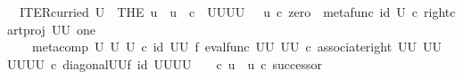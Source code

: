\begin{isabellebody}
\ \ {\isachardoublequoteopen}ITER{\isacharunderscore}{\kern0pt}curried\ U\ {\isacharequal}{\kern0pt}\ {\isacharparenleft}{\kern0pt}THE\ u\ {\isachardot}{\kern0pt}\ u\ {\isacharcolon}{\kern0pt}\ {\isasymnat}\isactrlsub c\ {\isasymrightarrow}\ {\isacharparenleft}{\kern0pt}U\isactrlbsup U\isactrlesup {\isacharparenright}{\kern0pt}\isactrlbsup U\isactrlbsup U\isactrlesup \isactrlesup \ {\isasymand}\ \ u\ {\isasymcirc}\isactrlsub c\ zero\ {\isacharequal}{\kern0pt}\ {\isacharparenleft}{\kern0pt}metafunc\ {\isacharparenleft}{\kern0pt}id\ U{\isacharparenright}{\kern0pt}\ {\isasymcirc}\isactrlsub c\ {\isacharparenleft}{\kern0pt}right{\isacharunderscore}{\kern0pt}cart{\isacharunderscore}{\kern0pt}proj\ {\isacharparenleft}{\kern0pt}U\isactrlbsup U\isactrlesup {\isacharparenright}{\kern0pt}\ one{\isacharparenright}{\kern0pt}{\isacharparenright}{\kern0pt}\isactrlsup {\isasymsharp}\ {\isasymand}\isanewline
\ \ \ \ {\isacharparenleft}{\kern0pt}{\isacharparenleft}{\kern0pt}meta{\isacharunderscore}{\kern0pt}comp\ U\ U\ U{\isacharparenright}{\kern0pt}\ {\isasymcirc}\isactrlsub c\ {\isacharparenleft}{\kern0pt}id\ {\isacharparenleft}{\kern0pt}U\isactrlbsup U\isactrlesup {\isacharparenright}{\kern0pt}\ {\isasymtimes}\isactrlsub f\ eval{\isacharunderscore}{\kern0pt}func\ {\isacharparenleft}{\kern0pt}U\isactrlbsup U\isactrlesup {\isacharparenright}{\kern0pt}\ {\isacharparenleft}{\kern0pt}U\isactrlbsup U\isactrlesup {\isacharparenright}{\kern0pt}{\isacharparenright}{\kern0pt}\ {\isasymcirc}\isactrlsub c\ {\isacharparenleft}{\kern0pt}associate{\isacharunderscore}{\kern0pt}right\ {\isacharparenleft}{\kern0pt}U\isactrlbsup U\isactrlesup {\isacharparenright}{\kern0pt}\ {\isacharparenleft}{\kern0pt}U\isactrlbsup U\isactrlesup {\isacharparenright}{\kern0pt}\ {\isacharparenleft}{\kern0pt}{\isacharparenleft}{\kern0pt}U\isactrlbsup U\isactrlesup {\isacharparenright}{\kern0pt}\isactrlbsup U\isactrlbsup U\isactrlesup \isactrlesup {\isacharparenright}{\kern0pt}{\isacharparenright}{\kern0pt}\ {\isasymcirc}\isactrlsub c\ {\isacharparenleft}{\kern0pt}diagonal{\isacharparenleft}{\kern0pt}U\isactrlbsup U\isactrlesup {\isacharparenright}{\kern0pt}{\isasymtimes}\isactrlsub f\ id\ {\isacharparenleft}{\kern0pt}{\isacharparenleft}{\kern0pt}U\isactrlbsup U\isactrlesup {\isacharparenright}{\kern0pt}\isactrlbsup U\isactrlbsup U\isactrlesup \isactrlesup {\isacharparenright}{\kern0pt}{\isacharparenright}{\kern0pt}{\isacharparenright}{\kern0pt}\isactrlsup {\isasymsharp}\ \ \ \ {\isasymcirc}\isactrlsub c\ u\ {\isacharequal}{\kern0pt}\ u\ {\isasymcirc}\isactrlsub c\ successor{\isacharparenright}{\kern0pt}{\isachardoublequoteclose}\isanewline

\end{isabellebody}
